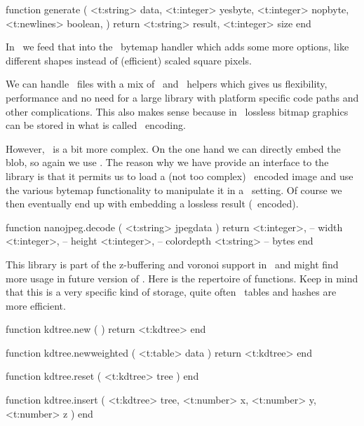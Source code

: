\starttyping[option=LUA]
function generate (
    <t:string>   data,
    <t:integer>  yesbyte,
    <t:integer>  nopbyte,
    <t:newlines> boolean,
)
    return
        <t:string>  result,
        <t:integer> size
end
\stoptyping

In \CONTEXT\ we feed that into the \LUAMETAFUN\ bytemap handler which adds some
more options, like different shapes instead of (efficient) scaled square pixels.

\stopsection

\startsubsection[title=JPEG]

We can handle \PNG\ files with a mix of \LUA\ and \CCODE\ helpers which gives us
flexibility, performance and no need for a large library with platform specific
code paths and other complications. This also makes sense because in \PDF\
lossless bitmap graphics can be stored in what is called \PNG\ encoding.

However, \JPEG\ is a bit more complex. On the one hand we can directly embed the
blob, so again we use \LUA. The reason why we have provide an interface to the
\type {nanojpeg} library is that it permits us to load a (not too complex) \JPEG\
encoded image and use the various bytemap functionality to manipulate it in a
\METAPOST\ setting. Of course we then eventually end up with embedding a lossless
result (\PNG\ encoded).

\starttyping[option=LUA]
function nanojpeg.decode ( <t:string> jpegdata )
    return
        <t:integer>, -- width
        <t:integer>, -- height
        <t:integer>, -- colordepth
        <t:string>   -- bytes
end
\stoptyping

\stopsection

\startsection[title=KD trees]

This library is part of the z-buffering and voronoi support in \LUAMETAFUN\ and
might find more usage in future version of \CONTEXT. Here is the repertoire of
functions. Keep in mind that this is a very specific kind of storage, quite often
\LUA\ tables and hashes are more efficient.

\starttyping[option=LUA]
function kdtree.new ( )
    return <t:kdtree>
end

function kdtree.newweighted (
    <t:table> data
)
    return <t:kdtree>
end

function kdtree.reset (
    <t:kdtree> tree
)
end

function kdtree.insert (
    <t:kdtree> tree,
    <t:number> x,
    <t:number> y,
    <t:number> z
)
end

